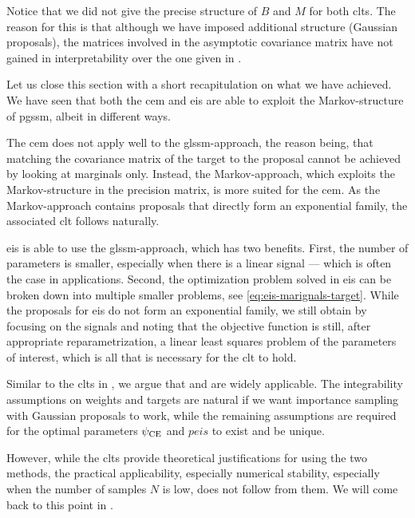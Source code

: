 Notice that we did not give the precise structure of $B$ and $M$ for both \glspl{clt}. The reason for this is that although we have imposed additional structure (Gaussian proposals), the matrices involved in the asymptotic covariance matrix have not gained in interpretability over the one given in .

Let us close this section with a short recapitulation on what we have achieved. We have seen that both the \gls{cem} and \gls{eis} are able to exploit the Markov-structure of \gls{pgssm}, albeit in different ways. 

The \gls{cem} does not apply well to the \gls{glssm}-approach, the reason being, that matching the covariance matrix of the target to the proposal cannot be achieved by looking at marginals only. Instead, the Markov-approach, which exploits the Markov-structure in the precision matrix, is more suited for the \gls{cem}. As the Markov-approach contains proposals that directly form an exponential family, the associated \gls{clt} follows naturally.

\gls{eis} is able to use the \gls{glssm}-approach, which has two benefits. First, the number of parameters is smaller, especially when there is a linear signal --- which is often the case in applications. Second, the optimization problem solved in \gls{eis} can be broken down into multiple smaller problems, see \eqref{eq:eis-marignals-target}. While the proposals for \gls{eis} do not form an exponential family, we still obtain  by focusing on the signals and noting that the objective function is still, after appropriate reparametrization, a linear least squares problem of the parameters of interest, which is all that is necessary for the \gls{clt} to hold.

Similar to the \glspl{clt} in , we argue that  and  are widely applicable. The integrability assumptions on weights and targets are natural if we want importance sampling with Gaussian proposals to work, while the remaining assumptions are required for the optimal parameters ${\psi_{\text{CE}}}$ and $peis$ to exist and be unique.

However, while the \glspl{clt} provide theoretical justifications for using the two methods, the practical applicability, especially numerical stability, especially when the number of samples $N$ is low, does not follow from them. We will come back to this point in .